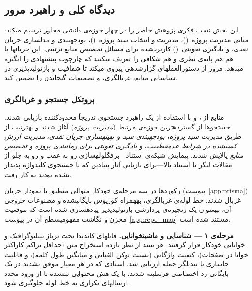 
\subsection{دیدگاه کلی و راهبرد مرور}
\label{subsec:lr_overview}

این بخش نسب فکری پژوهش حاضر را در چهار حوزه‌ی دانشی مجاور
ترسیم می\zwnj{}کند: مبانی مدیریت پروژه~()،
مدیریت و انتخاب سبد پروژه~()،
بودجه\zwnj{}بندی  و مدل\zwnj{}سازی جریان نقدی،
و یادگیری تقویتی~() کاربردشده برای مسائل تخصیص منابع ترتیبی.
این جریان\zwnj{}ها با هم هم پایه‌ی نظری و هم شکافی را تعریف می\zwnj{}کنند
که چارچوب پیشنهادی را انگیزه می\zwnj{}دهد.
مرور از دستورالعمل\zwnj{}های گزارش\zwnj{}دهی 
\citep{Page2021} پیروی می\zwnj{}کند تا شفافیت و بازتولیدپذیری
در شناسایی منابع، غربالگری، و تصمیمات گنجاندن را تضمین کند.

\subsubsection{پروتکل جستجو و غربالگری}
\label{subsubsec:prisma}

منابع از ،  و 
با استفاده از یک راهبرد جستجوی تدریجاً محدودکننده بازیابی شدند.
جستجوها از گسترده\zwnj{}ترین حوزه‌ی مرتبط (\emph{مدیریت پروژه})
آغاز شدند و به\zwnj{}ترتیب از طریق
\emph{مدیریت سبد پروژه}،
\emph{بودجه\zwnj{}بندی سبد و بهینه\zwnj{}سازی جریان نقدی}،
\emph{مدیریت ارزش کسب\zwnj{}شده در شرایط عدم\zwnj{}قطعیت}،
و \emph{یادگیری تقویتی برای زمان\zwnj{}بندی پروژه و تخصیص منابع}
پالایش شدند.
پیمایش شبکه‌ی استناد---برف\zwnj{}گلوله\zwnj{}سازی رو به عقب و رو به جلو
از مقالات لنگر با استناد بالا---برای بازیابی آثار بنیادین
که با جستجوی کلیدواژه پدیدار نشده بودند به کار رفت.

رکوردها در سه مرحله‌ی خودکار متوالی منطبق با نمودار جریان
 (پیوست~\ref{app:prisma}) غربال شدند.
خط لوله‌ی غربالگری، به\zwnj{}همراه کورپوس بایگانی\zwnj{}شده
و مصنوعات خروجی آن، به\zwnj{}عنوان یک زنجیره‌ی پردازشی بازتولیدپذیر
پیاده\zwnj{}سازی شده است که موقعیت مخزن و نگاشت مفهومی\zwnj{}سطح آن
در پیوست~\ref{app:repo_map} مستند شده است.

\medskip
\textbf{مرحله‌ی ۱ --- شناسایی و ماشین\zwnj{}خوانایی.}\;
فایل\zwnj{}های  کاندیدا تحت تریاژ بیبلیوگرافیک و خوانایی
خودکار قرار گرفتند.
هر سند از نظر بازده استخراج متن (حداقل تراکم کاراکتر خوانا در صفحات)،
کیفیت واژگانی (نسبت توکن الفبایی و میانگین طول کلمه)،
و قابلیت جاسازی با تبدیل\zwnj{}گر جمله ارزیابی شد.
اسنادی که در هر معیار موفق نشدند در یک بایگانی رد اختصاصی
قرنطینه شدند، با یک هش محتوایی ثبت\zwnj{}شده تا از ورود مجدد
ارسال\zwnj{}های تکراری به خط لوله جلوگیری شود.

